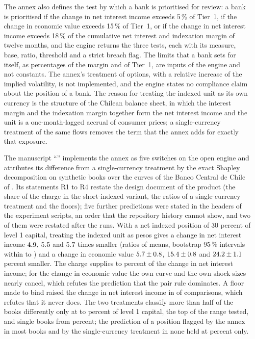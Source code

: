 The annex also defines the test by which a bank is prioritised for review: a bank is prioritised if the change in net interest income exceeds 5\,\% of Tier~1, if the change in economic value exceeds 15\,\% of Tier~1, or if the change in net interest income exceeds
18\,\% of the cumulative net interest and indexation margin of twelve months, and the engine returns the three tests, each with its measure, base, ratio, threshold and a strict breach flag. The limits that a bank sets for itself, as percentages of the margin and of
Tier~1, are inputs of the engine and not constants. The annex's treatment of options, with a relative increase of the implied volatility, is not implemented, and the engine states no compliance claim about the position of a bank. The reason for treating the indexed unit
as its own currency is the structure of the Chilean balance sheet, in which the interest margin and the indexation margin together form the net interest income and the unit is a one-month-lagged accrual of consumer prices; a single-currency treatment of the same flows removes
the term that the annex adds for exactly that exposure.

The manuscript ``\pxPaperTitleSeven{}'' implements the annex as five switches on the open engine and attributes its difference from a single-currency treatment by the exact Shapley
decomposition on synthetic books over the curves of the Banco Central de Chile of \pxPpSevenValDate{}. Its statements R1 to R4 restate the design document of the product (the share of the charge in the short-indexed
variant, the ratios of a single-currency treatment and the floors); five further predictions were stated in the headers of the experiment scripts, an order that the repository history cannot show, and two of them
were restated after the runs. With a net indexed position of 30 percent of level 1 capital, treating the indexed unit as pesos gives a change in net interest income $4.9$, $5.5$ and
$5.7$ times smaller (ratios of means, bootstrap 95\,\% intervals within \pxPpSevenRatioLo{} to \pxPpSevenRatioHi{}) and a change in economic value $5.7\pm0.8$,
$15.4\pm0.8$ and $24.2\pm1.1$ percent smaller. The charge supplies \pxPpSevenShareLo{} to \pxPpSevenShareHi{} percent of the change in net interest income; for
the change in economic value the own curve and the own shock sizes nearly cancel, which refutes the prediction that the pair rule dominates. A floor made to bind raised the change in net interest income in
\pxPpSevenFloorRaise{} of \pxPpSevenFloorTotal{} comparisons, which refutes that it never does. The two treatments classify more than half of the books differently only at \pxPpSevenSweepLo{} to
\pxPpSevenSweepHi{} percent of level 1 capital, the top of the range tested, and single books from \pxPpSevenSweepFirst{} percent; the prediction of a position flagged by the annex in most books and by the
single-currency treatment in none held at \pxPpSevenHFour{} percent only.

